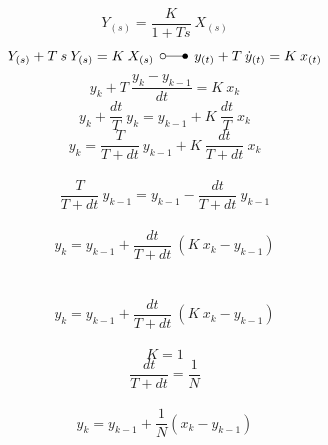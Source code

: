 \documentclass[
    10pt, %
    DIV12,
    english, %
    a5paper, %
    twoside, %
    titlepage, %
    parskip=half, %
    headings=small, %
    listof=totoc, %
    bibliography=totoc, %
    index=totoc, %
    captions=tableheading, %
    final %
]{scrbook}
\begin{document}
\begin{equation}
Y_{(s)} =  \frac{K}{1+T s} \: X_{(s)}\nonumber
\end{equation}
\begin{equation}
Y_{(s)}+ T \: s\: Y_{(s)} = K \:X_{(s)} \:\: \laplace \:\: y_{(t)}+T\:\dot{y}_{(t)}=K\: x_{(t)}\nonumber
\end{equation}
\begin{equation}
y_{k}+T\:\frac{y_k-y_{k-1}}{dt}=K\: x_k\nonumber
\end{equation}
\begin{equation}
y_{k}+\frac{dt}{T}\:y_k=y_{k-1}+K\:\frac{dt}{T}\:x_k\nonumber
\end{equation}
\begin{equation}
y_{k}=\frac{T}{T+dt}\:y_{k-1}+K\:\frac{dt}{T+dt}\:x_k\nonumber
\end{equation}
\\
\begin{equation}
\frac{T}{T+dt}\:y_{k-1}=y_{k-1}-\frac{dt}{T+dt}\:y_{k-1}\nonumber
\end{equation}
\\
\begin{equation}
y_{k}=y_{k-1}+\frac{dt}{T+dt}\:\left(K\:x_k-y_{k-1}\right)\nonumber
\end{equation}
\\
\\
\begin{equation}
y_{k}=y_{k-1}+\frac{dt}{T+dt}\:\left(K\:x_k-y_{k-1}\right)\nonumber
\end{equation}
\\
\begin{equation}
K=1\nonumber
\end{equation}
\begin{equation}
\frac{dt}{T+dt} = \frac{1}{N}\nonumber
\end{equation}
\\
\begin{equation}
y_{k}=y_{k-1}+\frac{1}{N}\left(x_{k}-y_{k-1}\right)\nonumber
\end{equation}
\end{document}
